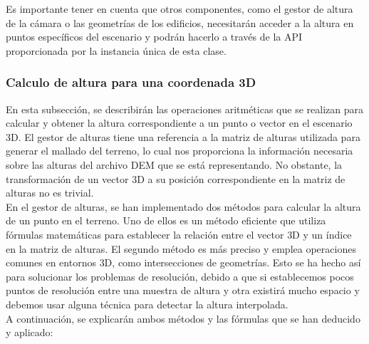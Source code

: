 \documentclass[a4paper, 11pt]{book}
\begin{document}
Es importante tener en cuenta que otros componentes, como el gestor de altura de la cámara o las geometrías de los edificios, necesitarán acceder a la altura en puntos específicos del escenario y podrán hacerlo a través de la \textsc{API} proporcionada por la instancia única de esta clase.
\subsubsection{Calculo de altura para una coordenada 3D}
\label{subsubsec:calculoAltura3D}
En esta subsección, se describirán las operaciones aritméticas que se realizan para calcular y obtener la altura correspondiente a un punto o vector en el escenario 3D. El gestor de alturas tiene una referencia a la matriz de alturas utilizada para generar el mallado del terreno, lo cual nos proporciona la información necesaria sobre las alturas del archivo \textsc{DEM} que se está representando. No obstante, la transformación de un vector 3D a su posición correspondiente en la matriz de alturas no es trivial.\\
En el gestor de alturas, se han implementado dos métodos para calcular la altura de un punto en el terreno. Uno de ellos es un método eficiente que utiliza fórmulas matemáticas para establecer la relación entre el vector \textsc{3D} y un índice en la matriz de alturas. El segundo método es más preciso y emplea operaciones comunes en entornos \textsc{3D}, como intersecciones de geometrías. Esto se ha hecho así para solucionar los problemas de resolución, debido a que si establecemos pocos puntos de resolución entre una muestra de altura y otra existirá mucho espacio y debemos usar alguna técnica para detectar la altura interpolada.\\
A continuación, se explicarán ambos métodos y las fórmulas que se han deducido y aplicado:
\end{document}
